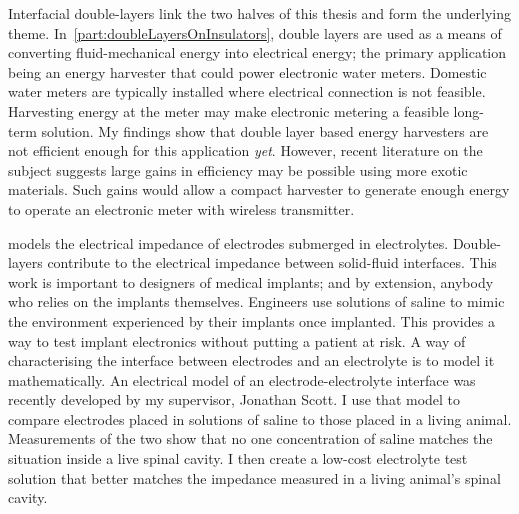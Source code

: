   Interfacial double-layers link the two halves of this thesis and form the underlying theme.
  In~\cref{part:doubleLayersOnInsulators}, double layers are used as a means of converting fluid-mechanical energy into electrical energy; the primary application being an energy harvester that could power electronic water meters.
  Domestic water meters are typically installed where electrical connection is not feasible.
  Harvesting energy at the meter may make electronic metering a feasible long-term solution.
  My findings show that double layer based energy harvesters are not efficient enough for this application \emph{yet}.
  However, recent literature on the subject suggests large gains in efficiency may be possible using more exotic materials.
  Such gains would allow a compact harvester to generate enough energy to operate an electronic meter with wireless transmitter.

   models the electrical impedance of electrodes submerged in electrolytes.
  Double-layers contribute to the electrical impedance between solid-fluid interfaces.
  This work is important to designers of medical implants; and by extension, anybody who relies on the implants themselves.
  Engineers use solutions of saline to mimic the environment experienced by their implants once implanted.
  This provides a way to test implant electronics without putting a patient at risk.
  A way of characterising the interface between electrodes and an electrolyte is to model it mathematically.
  An electrical model of an electrode-electrolyte interface was recently developed by my supervisor, Jonathan Scott.
  I use that model to compare electrodes placed in solutions of saline to those placed in a living animal.
  Measurements of the two show that no one concentration of saline matches the situation inside a live spinal cavity.
  I then create a low-cost electrolyte test solution that better matches the impedance measured in a living animal's spinal cavity.



